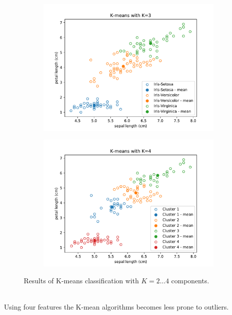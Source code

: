 \documentclass{article}
\begin{document}
\begin{figure}[!ht]
{	\begin{subfigure}{0.6\textwidth}
	\includegraphics[width=\textwidth]{./Figures/2_2_Kmeans_scatter_K3}
	\end{subfigure}
	\begin{subfigure}{0.6\textwidth}
	\includegraphics[width=\textwidth]{./Figures/2_2_Kmeans_scatter_K4}
	\end{subfigure}
	}	
	\caption{Results of K-means classification with $K=2\dots4$ components.}
	\label{2_2_Kmeans_scatter}
\end{figure}\\

Using four features the K-mean algorithms becomes less prone to outliers. 
\end{document}
